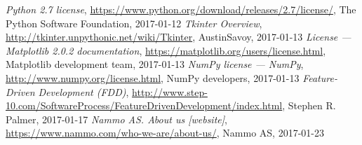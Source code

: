 \documentclass[BIND,english,oneside]{ntnubachelorthesis}
\begin{document}

\makefrontpages %




\tableofcontents
\listoffigures














\begin{thebibliography}{4}
    \emph{Python 2.7 license},
    \url{https://www.python.org/download/releases/2.7/license/},
    The Python Software Foundation,
    2017-01-12
    \emph{Tkinter Overview},
    \url{http://tkinter.unpythonic.net/wiki/Tkinter},
    AustinSavoy,
    2017-01-13
    \emph{License — Matplotlib 2.0.2 documentation},
    \url{https://matplotlib.org/users/license.html},
     Matplotlib development team,
     2017-01-13
    \emph{NumPy license — NumPy},
    \url{http://www.numpy.org/license.html},
    NumPy developers,
    2017-01-13
    \emph{Feature-Driven Development (FDD)},
    \url{http://www.step-10.com/SoftwareProcess/FeatureDrivenDevelopment/index.html},
    Stephen R. Palmer,
    2017-01-17
    \emph{Nammo AS. About us [website]},
    \url{https://www.nammo.com/who-we-are/about-us/},
    Nammo AS,
    2017-01-23
\end{thebibliography}


\appendix %

%

%
%
\end{document}
